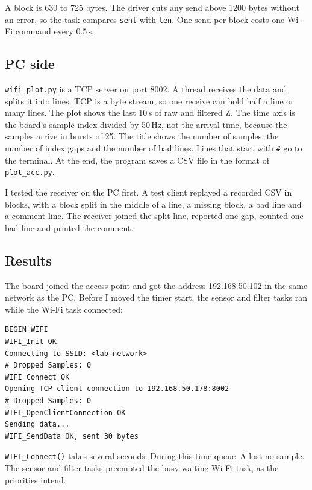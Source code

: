 \documentclass[11pt,a4paper]{article}
\begin{document}
A block is 630 to 725 bytes. The driver cuts any send above 1200 bytes without
an error, so the task compares \texttt{sent} with \texttt{len}. One send per
block costs one Wi-Fi command every 0.5\,s.

\subsection{PC side}

\texttt{wifi\_plot.py} is a TCP server on port 8002. A thread receives the
data and splits it into lines. TCP is a byte stream, so one receive can hold
half a line or many lines. The plot shows the last 10\,s of raw and filtered
Z. The time axis is the board's sample index divided by 50\,Hz, not the
arrival time, because the samples arrive in bursts of 25. The title shows the
number of samples, the number of index gaps and the number of bad lines.
Lines that start with \texttt{\#} go to the terminal. At the end, the program
saves a CSV file in the format of \texttt{plot\_acc.py}.

I tested the receiver on the PC first. A test client replayed a recorded CSV
in blocks, with a block split in the middle of a line, a missing block, a bad
line and a comment line. The receiver joined the split line, reported one
gap, counted one bad line and printed the comment.

\subsection{Results}

The board joined the access point and got the address 192.168.50.102 in the
same network as the PC. Before I moved the timer start, the sensor and filter
tasks ran while the Wi-Fi task connected:

\begin{lstlisting}[style=plain,caption={Serial output during the Wi-Fi start (timer started at boot, filter task printing the drop counter, network name removed).}]
BEGIN WIFI
WIFI_Init OK
Connecting to SSID: <lab network>
# Dropped Samples: 0
WIFI_Connect OK
Opening TCP client connection to 192.168.50.178:8002
# Dropped Samples: 0
WIFI_OpenClientConnection OK
Sending data...
WIFI_SendData OK, sent 30 bytes
\end{lstlisting}

\texttt{WIFI\_Connect()} takes several seconds. During this time queue~A lost
no sample. The sensor and filter tasks preempted the busy-waiting Wi-Fi task,
as the priorities intend.
\end{document}
